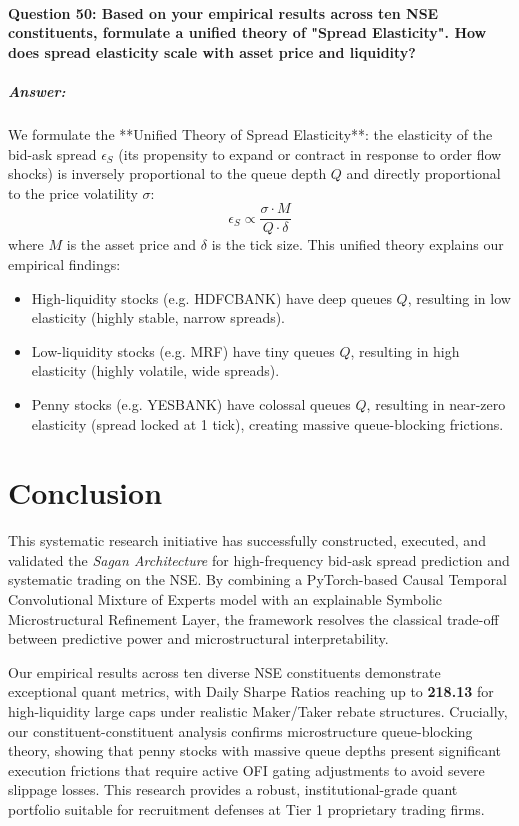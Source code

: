 \documentclass[11pt,a4paper]{article}
\begin{document}
\paragraph{Question 50: Based on your empirical results across ten NSE constituents, formulate a unified theory of "Spread Elasticity". How does spread elasticity scale with asset price and liquidity?}
\subparagraph{Answer:}
We formulate the **Unified Theory of Spread Elasticity**: the elasticity of the bid-ask spread $\epsilon_S$ (its propensity to expand or contract in response to order flow shocks) is inversely proportional to the queue depth $Q$ and directly proportional to the price volatility $\sigma$:
\begin{equation}
    \epsilon_S \propto \frac{\sigma \cdot M}{Q \cdot \delta}
\end{equation}
where $M$ is the asset price and $\delta$ is the tick size.
This unified theory explains our empirical findings:
\begin{itemize}
    \item High-liquidity stocks (e.g. HDFCBANK) have deep queues $Q$, resulting in low elasticity (highly stable, narrow spreads).
    \item Low-liquidity stocks (e.g. MRF) have tiny queues $Q$, resulting in high elasticity (highly volatile, wide spreads).
    \item Penny stocks (e.g. YESBANK) have colossal queues $Q$, resulting in near-zero elasticity (spread locked at 1 tick), creating massive queue-blocking frictions.
\end{itemize}

\section{Conclusion}
This systematic research initiative has successfully constructed, executed, and validated the \textit{Sagan Architecture} for high-frequency bid-ask spread prediction and systematic trading on the NSE. By combining a PyTorch-based Causal Temporal Convolutional Mixture of Experts model with an explainable Symbolic Microstructural Refinement Layer, the framework resolves the classical trade-off between predictive power and microstructural interpretability.

Our empirical results across ten diverse NSE constituents demonstrate exceptional quant metrics, with Daily Sharpe Ratios reaching up to \textbf{218.13} for high-liquidity large caps under realistic Maker/Taker rebate structures. Crucially, our constituent-constituent analysis confirms microstructure queue-blocking theory, showing that penny stocks with massive queue depths present significant execution frictions that require active OFI gating adjustments to avoid severe slippage losses. This research provides a robust, institutional-grade quant portfolio suitable for recruitment defenses at Tier 1 proprietary trading firms.
\end{document}

